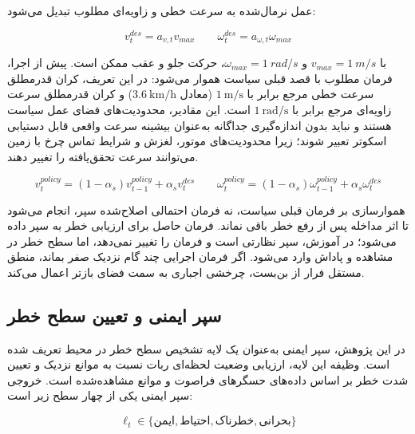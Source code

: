 عمل نرمال‌شده به سرعت خطی و زاویه‌ای مطلوب تبدیل می‌شود:

\begin{equation}
	v^{des}_t = a_{v,t} v_{max}
	\qquad
	\omega^{des}_t = a_{\omega,t} \omega_{max}
	\label{eq:action_scaling_final}
\end{equation}

با \(v_{max}=1~m/s\) و \(\omega_{max}=1~rad/s\)، حرکت جلو و عقب ممکن است. پیش از اجرا، فرمان مطلوب با قصد قبلی سیاست هموار می‌شود:
در این تعریف، کران قدرمطلق سرعت خطی مرجع برابر با $1~\mathrm{m/s}$ (معادل $3.6~\mathrm{km/h}$) و کران قدرمطلق سرعت زاویه‌ای مرجع برابر با $1~\mathrm{rad/s}$ است. این مقادیر، محدودیت‌های فضای عمل سیاست هستند و نباید بدون اندازه‌گیری جداگانه به‌عنوان بیشینه سرعت واقعی قابل دستیابی اسکوتر تعبیر شوند؛ زیرا محدودیت‌های موتور، لغزش و شرایط تماس چرخ با زمین می‌توانند سرعت تحقق‌یافته را تغییر دهند.


\begin{equation}
	v^{policy}_t = (1-\alpha_s)v^{policy}_{t-1} + \alpha_s v^{des}_t
	\qquad
	\omega^{policy}_t = (1-\alpha_s)\omega^{policy}_{t-1} + \alpha_s \omega^{des}_t
	\label{eq:policy_command_smoothing_final}
\end{equation}

هموارسازی بر فرمان قبلی سیاست، نه فرمان احتمالی اصلاح‌شده سپر، انجام می‌شود تا اثر مداخله پس از رفع خطر باقی نماند. فرمان حاصل برای ارزیابی خطر به سپر داده می‌شود؛ در آموزش، سپر نظارتی است و فرمان را تغییر نمی‌دهد، اما سطح خطر در مشاهده و پاداش وارد می‌شود. اگر فرمان اجرایی چند گام نزدیک صفر بماند، منطق مستقل فرار از بن‌بست، چرخشی اجباری به سمت فضای بازتر اعمال می‌کند.

\subsection{سپر ایمنی و تعیین سطح خطر}
\label{subsec:safety_shield_levels_final}

در این پژوهش، سپر ایمنی به‌عنوان یک لایه تشخیص سطح خطر در محیط تعریف شده است. وظیفه این لایه، ارزیابی وضعیت لحظه‌ای ربات نسبت به موانع نزدیک و تعیین شدت خطر بر اساس داده‌های حسگرهای فراصوت و موانع مشاهده‌شده است. خروجی سپر ایمنی یکی از چهار سطح زیر است:

\begin{equation}
	\ell_t \in 
	\{
	\text{ایمن},
	\text{احتیاط},
	\text{خطرناک},
	\text{بحرانی}
	\}
	\label{eq:shield_levels_final}
\end{equation}

